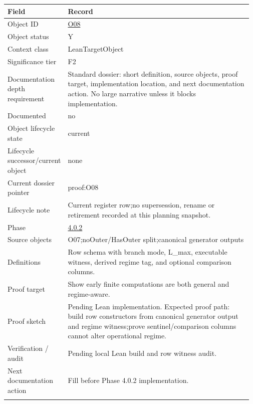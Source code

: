 \begin{longtable}{L{0.16\linewidth} L{0.81\linewidth}}
\hline
\textbf{Field} & \textbf{Record}\\
\hline
Object ID & \hyperlink{object-row-O08}{O08}\\
\hline\addlinespace[0.20em]
Object status & Y\\
\hline\addlinespace[0.20em]
Context class & LeanTargetObject\\
\hline\addlinespace[0.20em]
Significance tier & F2\\
\hline\addlinespace[0.20em]
Documentation depth requirement & Standard dossier: short definition, source objects, proof target, implementation location, and next documentation action. No large narrative unless it blocks implementation.\\
\hline\addlinespace[0.20em]
Documented & no\\
\hline\addlinespace[0.20em]
Object lifecycle state & current\\
\hline\addlinespace[0.20em]
Lifecycle successor/\allowbreak{}current object & none\\
\hline\addlinespace[0.20em]
Current dossier pointer & proof:O08\\
\hline\addlinespace[0.20em]
Lifecycle note & Current register row;\newline no supersession, rename or retirement recorded at this planning snapshot.\\
\hline\addlinespace[0.20em]
Phase & \hyperlink{phase-row-4-0-2}{4.0.2}\\
\hline\addlinespace[0.20em]
Source objects & O07;\newline noOuter/\allowbreak{}HasOuter split;\newline canonical generator outputs\\
\hline\addlinespace[0.20em]
Definitions & Row schema with branch mode, L\_max, executable witness, derived regime tag, and optional comparison columns.\\
\hline\addlinespace[0.20em]
Proof target & Show early finite computations are both general and regime-aware.\\
\hline\addlinespace[0.20em]
Proof sketch & Pending Lean implementation. Expected proof path: build row constructors from canonical generator output and regime witness;\newline prove sentinel/\allowbreak{}comparison columns cannot alter operational regime.\\
\hline\addlinespace[0.20em]
Verification /\allowbreak{} audit & Pending local Lean build and row witness audit.\\
\hline\addlinespace[0.20em]
Next documentation action & Fill before Phase 4.0.2 implementation.\\
\hline\addlinespace[0.20em]
\end{longtable}
